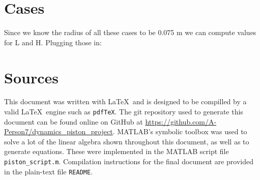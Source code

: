 \documentclass[nofoot,pdf-a,balance,colorlinks,upint,subscriptcorrection,varvw,mathalfa=cal=boondoxo]{asmeconf}
\begin{document}
    \section{Cases}\label{appendix:cases}
	  \begin{table}[H]
        \caption[Table]{Cases to consider (Given)}\label{tab:givenCases}
    \end{table}

	Since we know the radius of all these cases to be 0.075 m we can compute values for L and H. Plugging those in:
\begin{table}[H]
        \caption[Table]{Cases to consider (Absolute)}\label{tab:absCases}
    \end{table}


    

    

    \section{Sources}\label{appendix:sources} 

    This document was written with \LaTeX\ and is designed to be compilled by a valid \LaTeX\ engine such as \texttt{pdfTeX}. The git repository used to generate this document can be found online on GitHub at \href{https://github.com/A-Person7/dynamics_piston_project}{https://github.com/A-Person7/dynamics_piston_project}. MATLAB's symbolic toolbox was used to solve a lot of the linear algebra shown throughout this document, as well as to generate equations. These were implemented in the MATLAB script file \texttt{piston_script.m}. Compilation instructions for the final document are provided in the plain-text file \texttt{README}.


    
\end{document}
